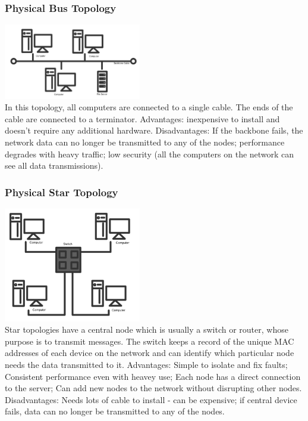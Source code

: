 \documentclass[a4paper,11pt, twocolumn]{article}
\begin{document}
\subsubsection{Physical Bus Topology}
\includegraphics[width=0.45\textwidth]{topoBus.jpg}\\
In this topology, all computers are connected to a single cable. The ends of the cable are connected to a terminator. Advantages: inexpensive to install and doesn't require any additional hardware. Disadvantages: If the backbone fails, the network data can no longer be transmitted to any of the nodes; performance degrades with heavy traffic; low security (all the computers on the network can see all data transmissions).
\subsubsection{Physical Star Topology}
\includegraphics[width=0.45\textwidth]{topoStar.jpg}\\
Star topologies have a central node which is usually a switch or router, whose purpose is to transmit messages. The switch keeps a record of the unique MAC addresses of each device on the network and can identify which particular node needs the data transmitted to it.
Advantages: Simple to isolate and fix faults; Consistent performance even with heavey use; Each node has a direct connection to the server; Can add new nodes to the network without disrupting other nodes. Disadvantages: Needs lots of cable to install - can be expensive; if central device fails, data can no longer be transmitted to any of the nodes.
\end{document}

